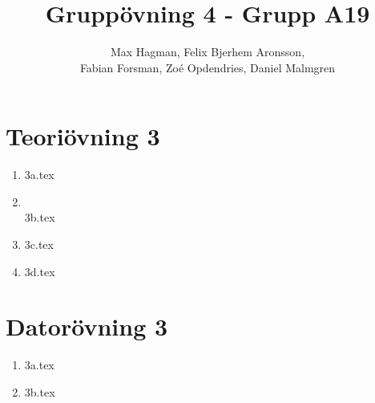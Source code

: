 \documentclass[a4paper]{report}
\title{Gruppövning 4 - Grupp A19}
\author{Max Hagman, Felix Bjerhem Aronsson,\\ Fabian Forsman, Zoé Opdendries, Daniel Malmgren}
\begin{document}
\maketitle

\section*{Teoriövning 3}
\begin{enumerate}[label=(\alph*)]
    \item {3a.tex}
    \item ~\\{3b.tex}
    \item {3c.tex}
    \item {3d.tex}
\end{enumerate}
\section*{Datorövning 3}
\begin{enumerate}[label=(\alph*)]
    \item {3a.tex}
    \item {3b.tex}
\end{enumerate}
\end{document}
